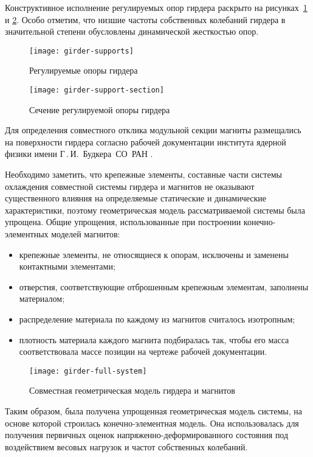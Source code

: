 Конструктивное исполнение регулируемых опор гирдера раскрыто на рисунках~\ref{fig:girder-supports} и \ref{fig:girder-support-section}. Особо отметим, что низшие частоты собственных колебаний гирдера в значительной степени обусловлены динамической жесткостью опор.

\begin{figure}[!htb]
	\centering
	\texttt{[image: girder-supports]}
	\caption{Регулируемые опоры гирдера} \label{fig:girder-supports}
\end{figure}

\begin{figure}[!htb]
	\centering
	\texttt{[image: girder-support-section]}
	\caption{Сечение регулируемой опоры гирдера} \label{fig:girder-support-section}
\end{figure}

Для определения совместного отклика модульной секции магниты размещались на поверхности гирдера согласно рабочей документации института ядерной физики имени Г\,.\,И.~Будкера~СО~РАН .

Необходимо заметить, что крепежные элементы, составные части системы охлаждения совместной системы гирдера и магнитов не оказывают существенного влияния на определяемые статические и динамические характеристики, поэтому геометрическая модель рассматриваемой системы была упрощена. Общие упрощения, использованные при построении конечно-элементных моделей магнитов:
\begin{itemize}
	\item крепежные элементы, не относящиеся к опорам, исключены и заменены контактными элементами;
	\item отверстия, соответствующие отброшенным крепежным элементам, заполнены материалом;
	\item распределение материала по каждому из магнитов считалось изотропным;
	\item плотность материала каждого магнита подбиралась так, чтобы его масса соответствовала массе позиции на чертеже рабочей документации.
\end{itemize} 

\begin{figure}[!htb]
	\centering
	\texttt{[image: girder-full-system]}
	\caption{Совместная геометрическая модель гирдера и магнитов} \label{fig:girder-full-system}
\end{figure}

Таким образом, была получена упрощенная геометрическая модель системы, на основе которой строилась конечно-элементная модель. Она использовалась для получения первичных оценок напряженно-деформированного состояния под воздействием весовых нагрузок и частот собственных колебаний. 

